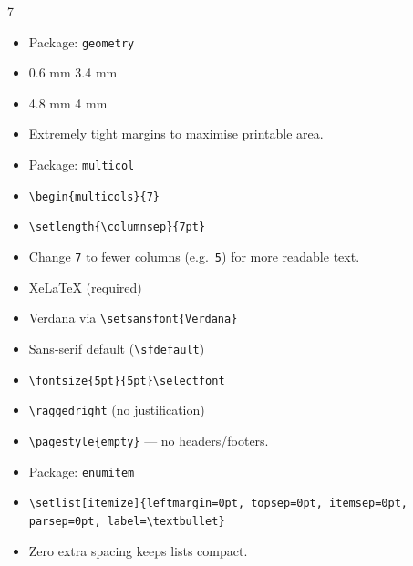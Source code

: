 \documentclass[a4paper,landscape]{article}
\begin{document}
\begin{multicols}{7}
\begin{itemize}
\item Package: \texttt{geometry}
\item {} 0.6 mm \quad {} 3.4 mm
\item {} 4.8 mm \quad {} 4 mm
\item Extremely tight margins to maximise printable area.
\end{itemize}

\begin{itemize}
\item Package: \texttt{multicol}
\item {} \texttt{\textbackslash begin\{multicols\}\{7\}}
\item {} \texttt{\textbackslash setlength\{\textbackslash columnsep\}\{7pt\}}
\item Change \texttt{7} to fewer columns (e.g.\ \texttt{5}) for more readable text.
\end{itemize}

\begin{itemize}
\item {} XeLaTeX (required)
\item {} Verdana via \texttt{\textbackslash setsansfont\{Verdana\}}
\item {} Sans-serif default (\texttt{\textbackslash sfdefault})
\item {} \texttt{\textbackslash fontsize\{5pt\}\{5pt\}\textbackslash selectfont}
\item {} \texttt{\textbackslash raggedright} (no justification)
\item {} \texttt{\textbackslash pagestyle\{empty\}} — no headers/footers.
\end{itemize}

\begin{itemize}
\item Package: \texttt{enumitem}
\item \texttt{\textbackslash setlist[itemize]\{leftmargin=0pt, topsep=0pt, itemsep=0pt, parsep=0pt, label=\textbackslash textbullet\}}
\item Zero extra spacing keeps lists compact.
\end{itemize}



\end{multicols}
\end{document}
